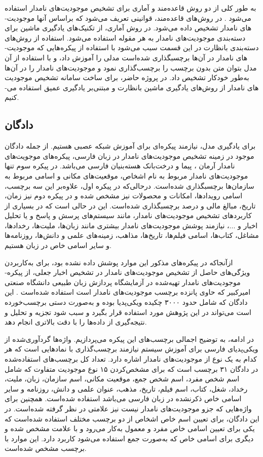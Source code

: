 به طور کلی از دو روش قاعده‌مند و آماری برای تشخیص موجودیت‌­های نامدار استفاده می‌­شود \citep{Jurafsky2009}. در روش‌­های قاعده‌مند، قوانینی تعریف می‌­شود که براساس آنها موجودیت‌­های نامدار تشخیص داده می‌­شود. در روش آماری، از تکنیک­‌های یادگیری ماشین برای دسته­‌بندی موجودیت­‌های نامدار به هر مقوله استفاده می‌­شود. استفاده از روش­‌های دسته‌بندی بانظارت در این قسمت سبب می‌­شود  با استفاده از پیکره‌ه­ایی که موجودیت‌­های نامدار  در آن‌ها برچسبگذاری شده‌است  مدلی را آموزش داد، و با استفاده از آن مدل بتوان متن بدون برچسب را برچسب‌گذاری نمود و موجودیت‌های نامدار را در آن‌ها به‌طور خودکار تشخیص داد. در پروژه حاضر، برای ساخت سامانه تشخیص موجودیت­‌های نامدار از روش­‌های یادگیری ماشین بانظارت و مبتنی‌بر یادگیری عمیق استفاده می‌­کنیم.

\subsection{دادگان}
برای یادگیری مدل، نیازمند پیکره‌­ای برای آموزش شبکه عصبی هستیم. از جمله دادگان موجود در زمینه تشخیص موجودیت­‌های نامدار در زبان فارسی، پیکره‌های موجویت‌­های نامدار آرمان \citep{poostchi2016personer}، پیما \citep{shahshahani2019peyma} و درخت‌بانک هسته‌بنیان فارسی \citep{ghayoomi2012} می‌­باشد. در پیکره سوم  تنها موجودیت‌­های نامدار مربوط به نام اشخاص، موقعیت­‌های مکانی و اسامی مربوط به سازمان‌­ها برچسبگذاری شده‌است. درحالی‌که در پیکره اول، علاوه‌بر این سه برچسب، اسامی رویدادها، امکانات و محصولات نیز مشخص شده و در پیکره دوم نیز زمان، تاریخ، مبالغ مالی و درصد برچسبگذاری شده‌است.  این در حالی است که در بسیاری از کاربردهای تشخیص موجودیت‌­های نامدار، مانند سیستم‌­های پرسش و پاسخ و یا تحلیل اخبار و ...، نیازمند پوشش موجودیت­‌های نامدار بیشتری مانند زبان‌­ها، ملیت‌­ها، رخدادها، مشاغل، کتاب‌­ها، اسامی فیلم‌­ها، تاریخ­‌ها، مذاهب، زمینه‌های علمی و دانش‌­ها، روزنامه‌­ها و سایر اسامی خاص در زبان هستیم.

ازآنجاکه در پیکره­‌های مذکور این موارد پوشش داده نشده بود، برای به‌کاربردن ویژگی‌های حاصل از تشخیص موجودیت­‌های نامدار در تشخیص اخبار جعلی، از پیکره‌­ موجودیت‌های نامدار تهیه‌شده در آزمایشگاه پردازش زبان طبیعی دانشگاه صنعتی امیرکبیر که حاوی پانزده برچسب موجودیت‌­های نامدار است استفاده شده‌است \citep{momtazi2020named}. این دادگان که شامل حدود ۳۰۰۰ چکیده ویکی‌پدیا بوده و به‌صورت دستی برچسب‌خورده است می‌­تواند در این پژوهش مورد استفاده قرار بگیرد و سبب شود تجزیه­ و­ تحلیل و نتیجه‌گیری از داده‌ها را با دقت بالاتری انجام دهد. 

در ادامه، به توضیح اجمالی برچسب‌های این پیکره می‌پردازیم. واژه‌ها گردآوری‌شده از ویکی‌پدیای فارسی برای آموزش سیستم نیازمند برچسب‌گذاری با نمادهایی است که هر کدام به یک نوع از موجودیت‌­های نامدار اشاره دارد. تعداد کل برچسب­‌های استفاده‌شده در دادگان ۳۱ برچسب است که برای مشخص‌کردن ۱۵ نوع موجودیت متفاوت که شامل اسم شخص مفرد، اسم شخص جمع، موقعیت مکانی، اسم سازمان، زبان، ملیت، رخداد، شغل، کتاب، اسم فیلم، تاریخ، مذهب، عنوان علمی و دانش، روزنامه و سایر اسامی خاص ذکرنشده در زبان فارسی می‌باشد استفاده شده‌است. همچنین برای واژه‌هایی که جزو موجودیت­‌های نامدار نیست نیز علامتی در نظر گرفته شده‌است. در این دادگان، برای تعیین اسم خاص اشخاص از دو برچسب مختلف استفاده شده‌است که یکی برای تعیین اسامی خاص مفرد و معمول به‌کار می‌­رود و با علامت  مشخص شده و دیگری برای اسامی خاص که به‌صورت جمع استفاده می‌شود کاربرد دارد. این موارد با برچسب  مشخص شده‌است.


